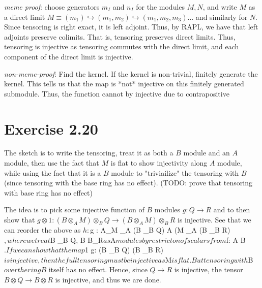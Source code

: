 \documentclass{book}
\begin{document}
\emph{meme proof}: choose generators $m_I$ and $n_I$ for the modules $M, N$, and write $M$ as a direct limit
$M \equiv (m_1) \hookrightarrow (m_1, m_2) \hookrightarrow (m_1, m_2, m_3) \dots$ and similarly for $N$.
Since tensoring is right exact, it is left adjoint. Thus, by RAPL, we have that left adjoints preserve
colimits. That is, tensoring preserves direct limits. Thus, tensoring is injective as tensoring commutes
with the direct limit, and each component of the direct limit is injective.

\emph{non-meme-proof}: Find the kernel. If the kernel is non-trivial, finitely generate the kernel. 
This tells us that the map is *not* injective on this finitely generated submodule. Thus, the function
cannot by injective due to contrapositive


\section{Exercise 2.20}
The sketch is to write the tensoring, treat it as both a $B$ module and an $A$ module, then use the fact that $M$
is flat to show injectivity along $A$ module, while using the fact that it is a $B$ module to "triviailize" the tensoring
with $B$ (since tensoring with the base ring has no effect).
(TODO: prove that tensoring with base ring has no effect)

The idea is to pick some injective function of $B$ modules $g: Q\rightarrow R$ and to then show that
$g \otimes 1: (B \otimes_A M) \otimes_B Q \rightarrow (B \otimes_A M) \otimes_B R$ is injective. See that
we can reorder the above as $h: $g : A_M \otimes_A (B \otimes_B Q) \rightarrow A (M \otimes_A (B \otimes_B R)$,
where we treat $B \otimes_B Q, B \otimes B_R$ as $A$ modules by restricton of scalars from $f: A \rightarrow B$.
If we can show that the map $1 \otimes g: (B \otimes_B Q) \rightarrow (B \otimes_B R)$ is injective, then the
full tensoring must be injective as $M$ is flat. But tensoring with $B$ over the ring B$ itself has no effect. Hence,
since $Q \rightarrow R$  is injective, the tensor $B \otimes Q \rightarrow B \otimes R$ is injective, and thus we are done.
\end{document}
